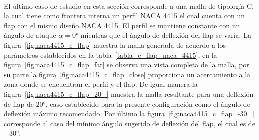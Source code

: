 \documentclass[letterpaper, openright, 12pt]{book}
\begin{document}
    \paragraph*{}
    El último caso de estudio en esta sección corresponde a una malla de
    tipología C, la cual tiene como frontera interna un perfil NACA 4415 el
    cual cuenta con un flap con el mismo diseño NACA 4415. El perfil se
    mantiene constante con un ángulo de ataque $\alpha = 0\si{\degree}$
    mientras que el ángulo de deflexión del flap se varía. La
    figura~\ref{fig:naca4415_c_flap} muestra la malla generada de acuerdo a los
    parámetros establecidos en la tabla~\ref{tabla_c_flap_naca_4415}, en la
    figura~\ref{fig:naca4415_c_flap_far} se observa una vista completa de la
    malla, por su parte la figura~\ref{fig:naca4415_c_flap_close} proporciona
    un acercamiento a la zona donde se encuentran el perfil y el flap. De igual
    manera la figura~\ref{fig:naca4415_c_flap_20_} muestra la malla resultante
    para una deflexión de flap de $20\si{\degree}$, caso establecido para la
    presente configuración como el ángulo de deflexión máximo recomendado. Por
    último la figura~\ref{fig:naca4415_c_flap_-30_} corresponde al caso del
    mínimo ángulo sugerido de deflexión del flap, el cual es de
    $-30\si{\degree}$.
\end{document}
